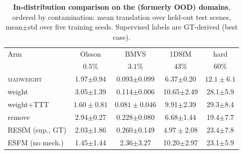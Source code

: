 \documentclass[10pt,twocolumn,letterpaper]{article}
\newcommand{\mad}{\textsc{madweight}}
\begin{document}
\begin{table}[t]\centering\scriptsize
\caption{\textbf{In-distribution comparison on the (formerly OOD) domains}, ordered by
contamination: mean translation over held-out test scenes, mean$\pm$std over five
training seeds. Supervised labels are GT-derived (best case).}
\label{tab:indist}
\setlength{\tabcolsep}{2.5pt}%
\begin{tabular}{lcccc}
\toprule
Arm & Olsson & BMVS & 1DSfM & hard\\
 & $0.5\%$ & $3.1\%$ & $43\%$ & $60\%$\\
\midrule
\mad{}      & 1.97$\pm$0.94 & 0.093$\pm$0.099 & 6.37$\pm$0.20 & $\mathbf{12.1\pm 6.1}$\\
weight      & 3.05$\pm$1.39 & 0.114$\pm$0.006 & 10.65$\pm$2.49 & 28.1$\pm$5.9\\
weight+TTT  & $\mathbf{1.60\pm 0.81}$ & $\mathbf{0.081\pm 0.046}$ & 9.91$\pm$2.39 & 29.3$\pm$8.4\\
remove      & 2.94$\pm$0.27 & 0.228$\pm$0.080 & 6.68$\pm$1.44 & 19.4$\pm$7.7\\
RESfM (sup., GT) & 2.03$\pm$1.86 & 0.260$\pm$0.149 & $\mathbf{4.97\pm 2.08}$ & 23.4$\pm$7.8\\
ESFM (no mech.) & 1.45$\pm$1.44 & 2.36$\pm$3.27 & 10.20$\pm$2.97 & 23.1$\pm$5.9\\
\bottomrule
\end{tabular}
\end{table}
\end{document}
